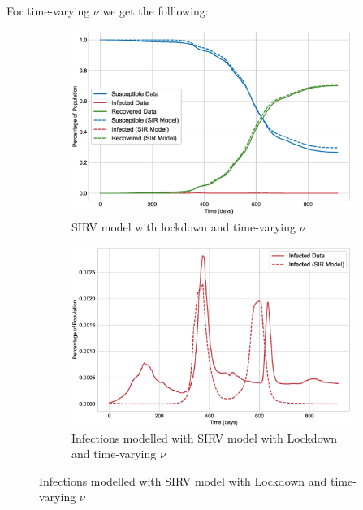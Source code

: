 \documentclass[tikz,fleqn,12pt]{wlscirep}
\begin{document}
For time-varying $\nu$ we get the folllowing:
\begin{figure}[H]
  \centering
  \caption{SIRV Model with lockdown and time-varying $\nu$ for India}

  \begin{subfigure}[t]{\textwidth}
    \centering
    \includegraphics[scale=0.50]{images/SIRV_model_with_lockdown_time_varying_nu_IND.eps}
    \caption{SIRV model with lockdown and time-varying $\nu$}
    \label{fig:SIRV_model_with_lockdown_time_varying_nu_IND}
  \end{subfigure}

  \begin{subfigure}[t]{\textwidth}
    \centering
    \includegraphics[scale=0.50]{images/SIRV_model_with_lockdown_infections_time_varying_nu_IND.eps}
    \caption{Infections modelled with SIRV model with Lockdown and time-varying $\nu$}
    \label{fig:SIRV_model_with_lockdown_infections_time_varying_nu_IND}
  \end{subfigure}
\end{figure}
\end{document}
